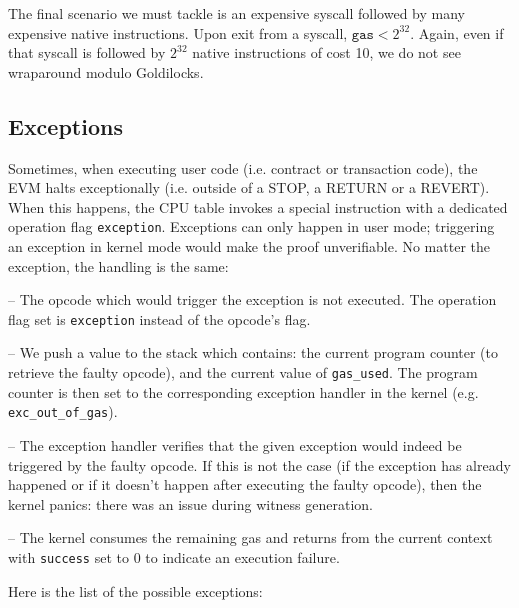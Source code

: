 The final scenario we must tackle is an expensive syscall followed by many expensive native instructions. Upon exit from a syscall, $\texttt{gas} < 2^{32}$. Again, even if that syscall is followed by $2^{32}$ native instructions of cost 10, we do not see wraparound modulo Goldilocks.


\subsection{Exceptions}
\label{exceptions}

Sometimes, when executing user code (i.e. contract or transaction code), the EVM halts exceptionally (i.e. outside of a STOP, a RETURN or a REVERT).
When this happens, the CPU table invokes a special instruction with a dedicated operation flag \texttt{exception}.
Exceptions can only happen in user mode; triggering an exception in kernel mode would make the proof unverifiable.
No matter the exception, the handling is the same:

-- The opcode which would trigger the exception is not executed. The operation flag set is \texttt{exception} instead of the opcode's flag.

-- We push a value to the stack which contains: the current program counter (to retrieve the faulty opcode), and the current value of \texttt{gas\_used}.
The program counter is then set to the corresponding exception handler in the kernel (e.g. \texttt{exc\_out\_of\_gas}).

-- The exception handler verifies that the given exception would indeed be triggered by the faulty opcode. If this is not the case (if the exception has already happened or if it doesn't happen after executing
the faulty opcode), then the kernel panics: there was an issue during witness generation.

-- The kernel consumes the remaining gas and returns from the current context with \texttt{success} set to 0 to indicate an execution failure.

Here is the list of the possible exceptions:

